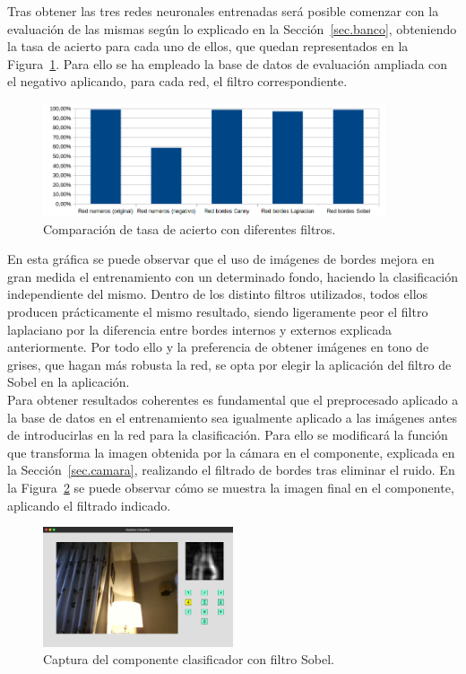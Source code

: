 Tras obtener las tres redes neuronales entrenadas será posible comenzar con la evaluación de las mismas según lo explicado en la Sección~\ref{sec.banco}, obteniendo la tasa de acierto para cada uno de ellos, que quedan representados en la Figura~\ref{fig.filtros}. Para ello se ha empleado la base de datos de evaluación ampliada con el negativo aplicando, para cada red, el filtro correspondiente.

\begin{figure}[H]
	\begin{center}
		\includegraphics[width=0.9\textwidth]{figures/filtros}
		\caption{Comparación de tasa de acierto con diferentes filtros.}
		\label{fig.filtros}
	\end{center}
\end{figure}

En esta gráfica se puede observar que el uso de imágenes de bordes mejora en gran medida el entrenamiento con un determinado fondo, haciendo la clasificación independiente del mismo. Dentro de los distinto filtros utilizados, todos ellos producen prácticamente el mismo resultado, siendo ligeramente peor el filtro laplaciano por la diferencia entre bordes internos y externos explicada anteriormente. Por todo ello y la preferencia de obtener imágenes en tono de grises, que hagan más robusta la red, se opta por elegir la aplicación del filtro de Sobel en la aplicación.\\

Para obtener resultados coherentes es fundamental que el preprocesado aplicado a la base de datos en el entrenamiento sea igualmente aplicado a las imágenes antes de introducirlas en la red para la clasificación. Para ello se modificará la función que transforma la imagen obtenida por la cámara en el componente, explicada en la Sección~\ref{sec.camara}, realizando el filtrado de bordes tras eliminar el ruido. En la Figura~\ref{fig.componente2} se puede observar cómo se muestra la imagen final en el componente, aplicando el filtrado indicado.

\begin{figure}[H]
	\begin{center}
		\includegraphics[width=0.5\textwidth]{figures/componente2}
		\caption{Captura del componente clasificador con filtro Sobel.}
		\label{fig.componente2}
	\end{center}
\end{figure}

